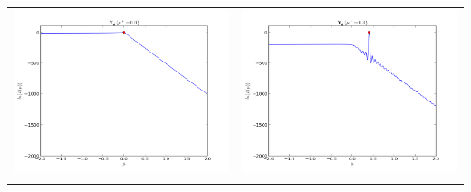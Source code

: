 \begin{table}[ht]
\begin{tabular}{cc}
\includegraphics[scale=0.3]{likelihood_hopf0}&\includegraphics[scale=0.3]{likelihood_hopf04}\\
\newline

\end{tabular}
\end{table}
